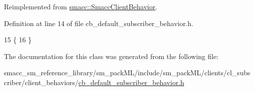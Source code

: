 Reimplemented from \hyperlink{classsmacc_1_1SmaccClientBehavior_a7962382f93987c720ad432fef55b123f}{smacc\+::\+Smacc\+Client\+Behavior}.



Definition at line 14 of file cb\+\_\+default\+\_\+subscriber\+\_\+behavior.\+h.


\begin{DoxyCode}
15     \{
16     \}
\end{DoxyCode}


The documentation for this class was generated from the following file\+:\begin{DoxyCompactItemize}
\item 
smacc\+\_\+sm\+\_\+reference\+\_\+library/sm\+\_\+pack\+M\+L/include/sm\+\_\+pack\+M\+L/clients/cl\+\_\+subscriber/client\+\_\+behaviors/\hyperlink{sm__packML_2include_2sm__packML_2clients_2cl__subscriber_2client__behaviors_2cb__default__subscriber__behavior_8h}{cb\+\_\+default\+\_\+subscriber\+\_\+behavior.\+h}\end{DoxyCompactItemize}
